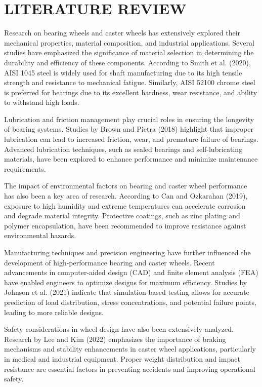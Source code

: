 \documentclass[../../main]{subfiles}
\begin{document}
\section{LITERATURE REVIEW}

Research on bearing wheels and caster wheels has extensively explored
their mechanical properties, material composition, and industrial
applications. Several studies have emphasized the significance of
material selection in determining the durability and efficiency of these
components. According to Smith et al. (2020), AISI 1045 steel is widely
used for shaft manufacturing due to its high tensile strength and
resistance to mechanical fatigue. Similarly, AISI 52100 chrome steel is
preferred for bearings due to its excellent hardness, wear resistance,
and ability to withstand high loads.

Lubrication and friction management play crucial roles in ensuring the
longevity of bearing systems. Studies by Brown and Pietra (2018)
highlight that improper lubrication can lead to increased friction,
wear, and premature failure of bearings. Advanced lubrication
techniques, such as sealed bearings and self-lubricating materials, have
been explored to enhance performance and minimize maintenance
requirements.

The impact of environmental factors on bearing and caster wheel
performance has also been a key area of research. According to Can and
Ozkarahan (2019), exposure to high humidity and extreme temperatures can
accelerate corrosion and degrade material integrity. Protective
coatings, such as zinc plating and polymer encapsulation, have been
recommended to improve resistance against environmental hazards.

Manufacturing techniques and precision engineering have further
influenced the development of high-performance bearing and caster
wheels. Recent advancements in computer-aided design (CAD) and finite
element analysis (FEA) have enabled engineers to optimize designs for
maximum efficiency. Studies by Johnson et al. (2021) indicate that
simulation-based testing allows for accurate prediction of load
distribution, stress concentrations, and potential failure points,
leading to more reliable designs.

Safety considerations in wheel design have also been extensively
analyzed. Research by Lee and Kim (2022) emphasizes the importance of
braking mechanisms and stability enhancements in caster wheel
applications, particularly in medical and industrial equipment. Proper
weight distribution and impact resistance are essential factors in
preventing accidents and improving operational safety.
\end{document}
